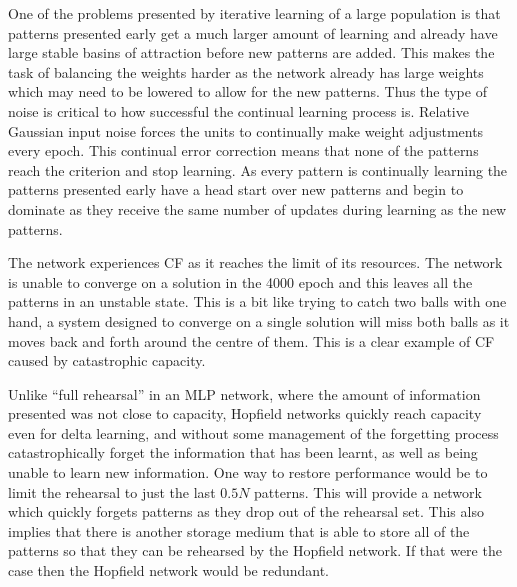 One of the problems presented by iterative learning of a large population is that patterns presented early get a much larger amount of learning and already have large stable basins of attraction before new patterns are added.  This makes the task of balancing the weights harder as the network already has large weights which may need to be lowered to allow for the new patterns.  Thus the type of noise is critical to how successful the continual learning process is.  Relative Gaussian input noise forces the units to continually make weight adjustments every epoch.  This continual error correction means that none of the patterns reach the criterion and stop learning. As every pattern is continually learning the patterns presented early have a head start over new patterns and begin to dominate as they receive the same number of updates during learning as the new patterns.  

The network experiences CF as it reaches the limit of its resources.  The network is unable to converge on a solution in the 4000 epoch and this leaves all the patterns in an unstable state.  This is a bit like trying to catch two balls with one hand, a system designed to converge on a single solution will miss both balls as it moves back and forth around the centre of them. This is a clear example of CF caused by catastrophic capacity.


Unlike ``full rehearsal'' in an MLP network, where the amount of information presented was not close to capacity, Hopfield networks quickly reach capacity even for delta learning, and without some management of the forgetting process catastrophically forget the information that has been learnt, as well as being unable to learn new information.  One way to restore performance would be to limit the rehearsal to just the last $0.5N$ patterns.  This will provide a network which quickly forgets patterns as they drop out of the rehearsal set.  This also implies  that there is another storage medium that is able to store all of the patterns so that they can be rehearsed by the Hopfield network. If that were the case then the Hopfield network would be redundant.

